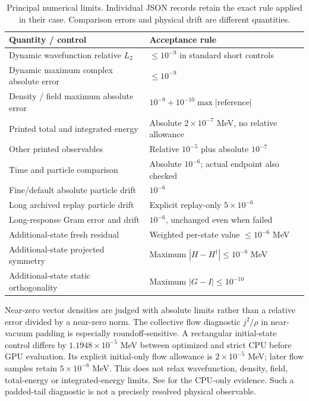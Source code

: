 \documentclass[11pt,a4paper]{article}
\newcommand{\ev}[1]{\path{#1.json}}
\begin{document}
\begin{table}[htbp]\centering\small
\begin{tabular}{@{}p{.48\linewidth}p{.43\linewidth}@{}}\toprule
Quantity / control & Acceptance rule\\\midrule
Dynamic wavefunction relative $L_2$ & $\leq10^{-9}$ in standard short controls\\
Dynamic maximum complex absolute error & $\leq10^{-9}$\\
Density / field maximum absolute error & $10^{-9}+10^{-10}\max|\text{reference}|$\\
Printed total and integrated energy & Absolute $2\times10^{-7}$ MeV, no relative allowance\\
Other printed observables & Relative $10^{-5}$ plus absolute $10^{-7}$\\
Time and particle comparison & Absolute $10^{-6}$; actual endpoint also checked\\
Fine/default absolute particle drift & $10^{-6}$\\
Long archived replay particle drift & Explicit replay-only $5\times10^{-6}$\\
Long-response Gram error and drift & $10^{-6}$, unchanged even when failed\\
Additional-state fresh residual & Weighted per-state value $\leq10^{-6}$ MeV\\
Additional-state projected symmetry & Maximum $|H-H^\dagger|\leq10^{-8}$ MeV\\
Additional-state static orthogonality & Maximum $|G-I|\leq10^{-10}$\\\bottomrule
\end{tabular}
\caption{Principal numerical limits. Individual JSON records retain the exact rule applied in their case. Comparison errors and physical drift are different quantities.}
\label{tab:limits}\end{table}

Near-zero vector densities are judged with absolute limits rather than a
relative error divided by a near-zero norm. The collective flow diagnostic
$j^2/\rho$ in near-vacuum padding is especially roundoff-sensitive. A
rectangular initial-state control differs by $1.1948\times10^{-5}$ MeV
between optimized and strict CPU before GPU evaluation. Its explicit
initial-only flow allowance is $2\times10^{-5}$ MeV; later flow samples
retain $5\times10^{-6}$ MeV. This does not relax wavefunction, density,
field, total-energy or integrated-energy limits. See
\ev{initial-flow-cpu-control} for the CPU-only evidence. Such a padded-tail
diagnostic is not a precisely resolved physical observable.
\end{document}
